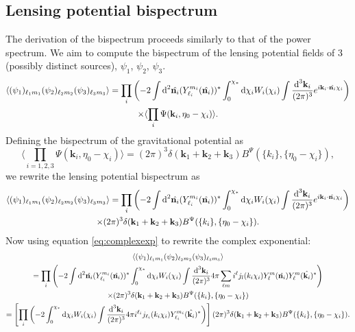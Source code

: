 \documentclass[11pt]{article} %
\DeclareRobustCommand{\d}{\ifmmode\text{d}\else d\fi}
\newcommand{\br}[1]{\ensuremath{\left( #1 \right)}}
\newcommand{\sbr}[1]{\ensuremath{\left[ #1 \right]}}
\begin{document}
\subsection{Lensing potential bispectrum}
The derivation of the bispectrum proceeds similarly to that of the power spectrum. We aim to compute the bispectrum of the lensing potential fields of 3 (possibly distinct sources), $\psi_1$, $\psi_2$, $\psi_3$. 
\begin{gather*}
    \langle (\psi_1)_{\ell_1m_1}(\psi_2)_{\ell_2m_2}(\psi_3)_{\ell_3m_3} \rangle = 
    \prod_i\br{-2\int\d^2\hat{\mathbf n_i}(Y^{m_i}_{\ell_i}(\hat{\mathbf n_i}))^*\int_0^{\chi_*}\d\chi_i W_i(\chi_i)\int\frac{\d^3\mathbf k_i}{(2\pi)^{3}}e^{i\mathbf k_i \cdot\hat{\mathbf n_i}\chi_i}} \\
    \times \langle \prod_i\Psi(\mathbf k_i, \eta_0 - \chi_i) \rangle.
\end{gather*}
Defining the bispectrum of the gravitational potential as
\begin{equation*}
    \langle \prod_{i=1,2,3}\Psi(\mathbf k_i, \eta_0 - \chi_i) \rangle = (2\pi)^3\delta(\mathbf k_1 + \mathbf k_2 + \mathbf k_3)B^\Psi(\{k_i\}, \{\eta_0-\chi_i\}),
\end{equation*}
we rewrite the lensing potential bispectrum as
\begin{gather*}
    \langle (\psi_1)_{\ell_1m_1}(\psi_2)_{\ell_2m_2}(\psi_3)_{\ell_3m_3} \rangle = 
    \prod_i\br{-2\int\d^2\hat{\mathbf n_i}(Y^{m_i}_{\ell_i}(\hat{\mathbf n_i}))^*\int_0^{\chi_*}\d\chi_i W_i(\chi_i)\int\frac{\d^3\mathbf k_i}{(2\pi)^{3}}e^{i\mathbf k_i \cdot\hat{\mathbf n_i}\chi_i}}\\ \times (2\pi)^3\delta(\mathbf k_1 + \mathbf k_2 + \mathbf k_3)B^\Psi(\{k_i\}, \{\eta_0-\chi_i\}).
\end{gather*}
Now using equation \eqref{eq:complexexp} to rewrite the complex exponential:
\begin{gather*}
    \langle (\psi_1)_{\ell_1m_1}(\psi_2)_{\ell_2m_2}(\psi_3)_{\ell_3m_3} \rangle \\ = 
    \prod_i\br{-2\int\d^2\hat{\mathbf n_i}(Y^{m_i}_{\ell_i}(\hat{\mathbf n_i}))^*\int_0^{\chi_*}\d\chi_i W_i(\chi_i)\int\frac{\d^3\mathbf k_i}{(2\pi)^{3}}4\pi\sum_{\ell m}i^{\ell}j_{l}(k_i\chi_i)Y_{\ell}^{m}(\hat{\mathbf n_i})Y_{\ell}^{m}(\hat{\mathbf k_i})^*}\\
    \times (2\pi)^3\delta(\mathbf k_1 + \mathbf k_2 + \mathbf k_3)B^\Psi(\{k_i\}, \{\eta_0-\chi_i\}) \\
    = \sbr{\prod_i\br{-2\int_0^{\chi_*}\d\chi_i W_i(\chi_i)\int\frac{\d^3\mathbf k_i}{(2\pi)^{3}}4\pi i^{\ell_i}j_{\ell_i}(k_i\chi_i)Y_{\ell_i}^{m_i}(\hat{\mathbf k_i})^*}} (2\pi)^3\delta(\mathbf k_1 + \mathbf k_2 + \mathbf k_3)B^\Psi(\{k_i\}, \{\eta_0-\chi_i\}).
\end{gather*}
\end{document}

